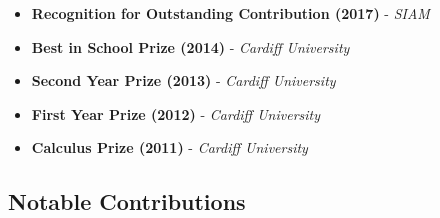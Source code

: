 \documentclass[10pt,a4paper,sans]{moderncv}        %
\begin{document}
	\begin{multicols}{2}
		\begin{itemize}
			
			\item{\textbf{Recognition for Outstanding Contribution (2017)} - \small{\textit{SIAM}}}
			
			\vspace{6pt}
			
			\item{\textbf{Best in School Prize (2014)} - \small{\textit{Cardiff University}}}
			
			\vspace{6pt}
			
			\item{\textbf{Second Year Prize (2013)} - \small{\textit{Cardiff University}}}
			
			\vspace{6pt}
			
			\item{\textbf{First Year Prize (2012)} - \small{\textit{Cardiff University}}}
			
			\vspace{6pt}
			
			\item{\textbf{Calculus Prize (2011)} - \small{\textit{Cardiff University}}}
			
		\end{itemize}
	\end{multicols}
	
	\subsection{Notable Contributions}
	
	\vspace{5pt}
	
\end{document}
